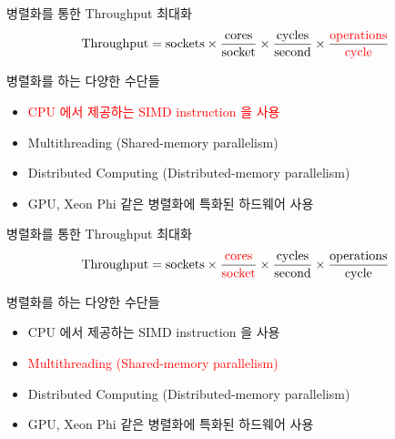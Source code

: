 \documentclass{bredelebeamer}
\begin{document}
\begin{frame}{병렬화를 통한 Throughput 최대화}
  \begin{align*}
    \text{Throughput} = \text{sockets} \times
    \frac{\text{cores}}{\text{socket}} \times
    \frac{\text{cycles}}{\text{second}} \times
    \frac{\text{\textcolor{red}{operations}}}{\text{\textcolor{red}{cycle}}}
  \end{align*}
  \begin{block}{병렬화를 하는 다양한 수단들}
    \begin{itemize}
    \item \textcolor{red}{CPU 에서 제공하는 SIMD instruction 을 사용}
    \item Multithreading (Shared-memory parallelism)
    \item Distributed Computing (Distributed-memory parallelism)
    \item GPU, Xeon Phi 같은 병렬화에 특화된 하드웨어 사용
    \end{itemize}
  \end{block}
\end{frame}

\begin{frame}{병렬화를 통한 Throughput 최대화}
  \begin{align*}
    \text{Throughput} = \text{sockets} \times
    \frac{\text{\textcolor{red}{cores}}}{\text{\textcolor{red}{socket}}} \times
    \frac{\text{cycles}}{\text{second}} \times
    \frac{\text{operations}}{\text{cycle}}
  \end{align*}
  \begin{block}{병렬화를 하는 다양한 수단들}
    \begin{itemize}
    \item CPU 에서 제공하는 SIMD instruction 을 사용
    \item \textcolor{red}{Multithreading (Shared-memory parallelism)}
    \item Distributed Computing (Distributed-memory parallelism)
    \item GPU, Xeon Phi 같은 병렬화에 특화된 하드웨어 사용
    \end{itemize}
  \end{block}
\end{frame}
\end{document}

